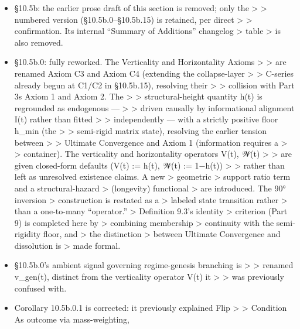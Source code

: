 \documentclass[
]{article}
\begin{document}
\begin{itemize}
\item
  §10.5b: the earlier prose draft of this section is removed; only the
  \textgreater{} \textgreater{} numbered version (§10.5b.0--§10.5b.15)
  is retained, per direct \textgreater{} \textgreater{} confirmation.
  Its internal ``Summary of Additions'' changelog \textgreater{} table
  \textgreater{} is also removed.
\item
  §10.5b.0: fully reworked. The Verticality and Horizontality Axioms
  \textgreater{} \textgreater{} are renamed Axiom C3 and Axiom C4
  (extending the collapse-layer \textgreater{} \textgreater{} C-series
  already begun at C1/C2 in §10.5b.15), resolving their \textgreater{}
  \textgreater{} collision with Part 3s Axiom 1 and Axiom 2. The
  \textgreater{} \textgreater{} structural-height quantity h(t) is
  regrounded as endogenous --- \textgreater{} \textgreater{} driven
  causally by informational alignment I(t) rather than fitted
  \textgreater{} \textgreater{} independently --- with a strictly
  positive floor h\_min (the \textgreater{} \textgreater{} semi-rigid
  matrix state), resolving the earlier tension between \textgreater{}
  \textgreater{} Ultimate Convergence and Axiom 1 (information requires
  a \textgreater{} \textgreater{} container). The verticality and
  horizontality operators V(t), 𝒲(t) \textgreater{} \textgreater{} are
  given closed-form defaults (V(t) := h(t), 𝒲(t) := 1−h(t))
  \textgreater{} \textgreater{} rather than left as unresolved existence
  claims. A new \textgreater{} geometric \textgreater{} support ratio
  term and a structural-hazard \textgreater{} (longevity) functional
  \textgreater{} are introduced. The 90° inversion \textgreater{}
  construction is restated as a \textgreater{} labeled state transition
  rather \textgreater{} than a one-to-many ``operator.'' \textgreater{}
  Definition 9.3's identity \textgreater{} criterion (Part 9) is
  completed here by \textgreater{} combining membership \textgreater{}
  continuity with the semi-rigidity floor, and \textgreater{} the
  distinction \textgreater{} between Ultimate Convergence and
  dissolution is \textgreater{} made formal.
\item
  §10.5b.0's ambient signal governing regime-genesis branching is
  \textgreater{} \textgreater{} renamed v\_gen(t), distinct from the
  verticality operator V(t) it \textgreater{} \textgreater{} was
  previously confused with.
\item
  Corollary 10.5b.0.1 is corrected: it previously explained Flip
  \textgreater{} \textgreater{} Condition As outcome via mass-weighting,

\end{itemize}
\end{document}
